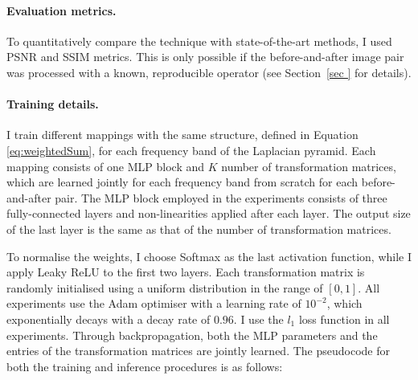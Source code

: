 \paragraph{Evaluation metrics.} To quantitatively compare the technique with state-of-the-art methods, I used PSNR and SSIM metrics. This is only possible if the before-and-after image pair was processed with a known, reproducible operator (see Section~\ref{sec
} for details).

\paragraph{Training details.}\label{train_det} I train different mappings with the same structure, defined in Equation \ref{eq:weightedSum}, for each frequency band of the Laplacian pyramid. Each mapping consists of one MLP block and $K$ number of transformation matrices, which are learned jointly for each frequency band from scratch for each before-and-after pair. The MLP block employed in the experiments consists of three fully-connected layers and non-linearities applied after each layer. The output size of the last layer is the same as that of the number of transformation matrices.

To normalise the weights, I choose Softmax as the last activation function, while I apply Leaky ReLU to the first two layers. Each transformation matrix is randomly initialised using a uniform distribution in the range of $[0, 1]$. All experiments use the Adam optimiser with a learning rate of $10^{-2}$, which exponentially decays with a decay rate of $0.96$. I use the $l_1$ loss function in all experiments. Through backpropagation, both the MLP parameters and the entries of the transformation matrices are jointly learned. The pseudocode for both the training and inference procedures is as follows:

